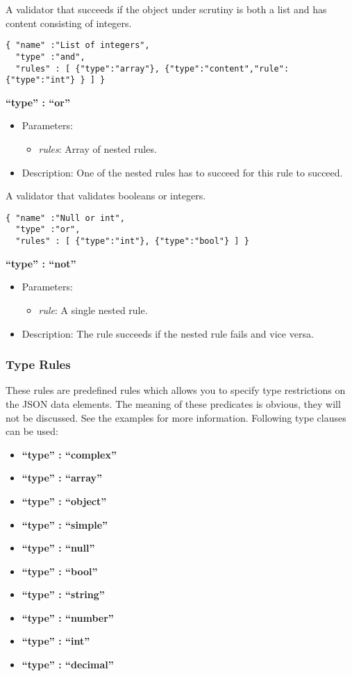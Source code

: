 \documentclass[a4paper]{article}
\newcommand{\ruledef}[3]{
\medskip
\textbf{#1}

\begin{itemize}
\setlength{\itemsep}{1pt}
\setlength{\parskip}{0pt}
\setlength{\parsep}{0pt}
   \item Parameters: #2
   \item Description: #3
\end{itemize}
}
\newcommand{\rulename}[1]{\textbf{``type'' : ``#1''}}
\newcommand{\param}[1]{\textsl{#1}:}
\begin{document}
A validator that succeeds if the object under scrutiny is both a list and has content consisting of integers.
\begin{lstlisting}
{ "name" :"List of integers",
  "type" :"and",
  "rules" : [ {"type":"array"}, {"type":"content","rule":{"type":"int"} } ] }
\end{lstlisting}

\ruledef{\rulename{or}}{\begin{itemize} \item \param{rules} Array of nested rules.\end{itemize}}{One of the nested rules has to succeed for this rule to succeed.}

A validator that validates booleans or integers.
\begin{lstlisting}
{ "name" :"Null or int",
  "type" :"or",
  "rules" : [ {"type":"int"}, {"type":"bool"} ] }
\end{lstlisting}

\ruledef{\rulename{not}}{\begin{itemize} \item \param{rule} A single nested rule. \end{itemize}}{The rule succeeds if the nested rule fails and vice versa.}

\subsubsection{Type Rules }

These rules are predefined rules which allows you to specify type restrictions on the JSON data elements. The meaning of these predicates is obvious, they will not be discussed. See the examples for more information. Following type clauses can be used: 

\begin{itemize}
\setlength{\itemsep}{1pt}
\setlength{\parskip}{0pt}
\setlength{\parsep}{0pt}
   \item  \rulename{complex}
   \item  \rulename{array}
   \item  \rulename{object}
   \item  \rulename{simple}
   \item  \rulename{null}
   \item  \rulename{bool}
   \item  \rulename{string}
   \item  \rulename{number}
   \item  \rulename{int}
   \item  \rulename{decimal}
\end{itemize}
\end{document}
